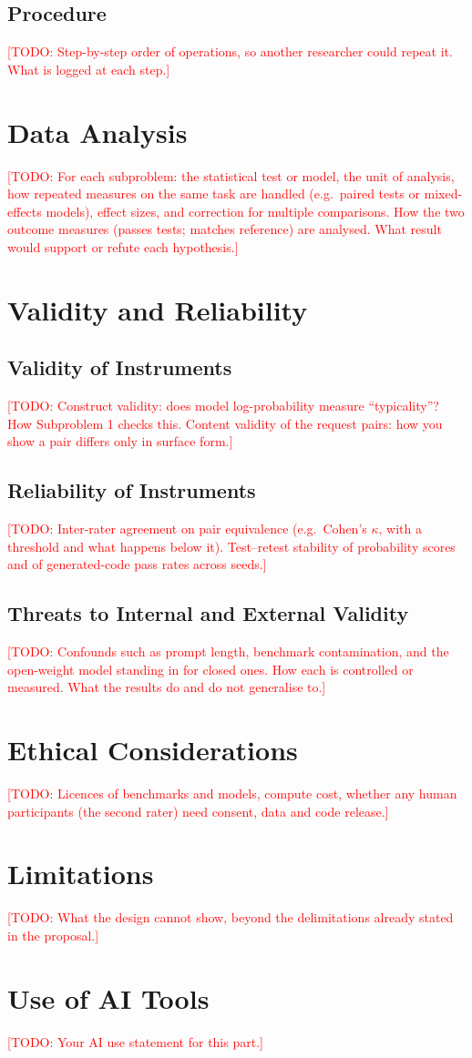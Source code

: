 \documentclass[conference]{IEEEtran}
\newcommand{\todo}[1]{\textcolor{red}{[TODO: #1]}}
\begin{document}
\subsection{Procedure}
\todo{Step-by-step order of operations, so another researcher could repeat
it. What is logged at each step.}

\section{Data Analysis}
\todo{For each subproblem: the statistical test or model, the unit of
analysis, how repeated measures on the same task are handled (e.g.\ paired
tests or mixed-effects models), effect sizes, and correction for multiple
comparisons. How the two outcome measures (passes tests; matches
reference) are analysed. What result would support or refute each
hypothesis.}

\section{Validity and Reliability}

\subsection{Validity of Instruments}
\todo{Construct validity: does model log-probability measure
``typicality''? How Subproblem 1 checks this. Content validity of the
request pairs: how you show a pair differs only in surface form.}

\subsection{Reliability of Instruments}
\todo{Inter-rater agreement on pair equivalence (e.g.\ Cohen's $\kappa$,
with a threshold and what happens below it). Test--retest stability of
probability scores and of generated-code pass rates across seeds.}

\subsection{Threats to Internal and External Validity}
\todo{Confounds such as prompt length, benchmark contamination, and the
open-weight model standing in for closed ones. How each is controlled or
measured. What the results do and do not generalise to.}

\section{Ethical Considerations}
\todo{Licences of benchmarks and models, compute cost, whether any human
participants (the second rater) need consent, data and code release.}

\section{Limitations}
\todo{What the design cannot show, beyond the delimitations already
stated in the proposal.}

\appendices
\section{Use of AI Tools}
\todo{Your AI use statement for this part.}



\end{document}

